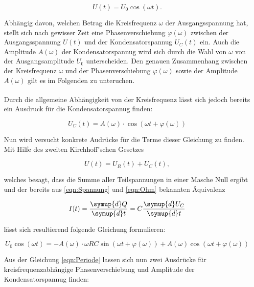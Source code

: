 \begin{equation}
    U(t) = U_0\cos(\omega t).
\end{equation}

\noindent Abhängig davon, welchen Betrag die Kreisfrequenz $\omega$ der Ausgangsspannung hat, stellt sich nach gewisser Zeit eine
Phasenverschiebung $\varphi(\omega)$ zwischen der Ausgangsspannung $U(t)$ und der Kondensatorspannug $U_C(t)$ ein. Auch
die Amplitude $A(\omega)$ der Kondensatorspannug wird sich durch die Wahl von $\omega$ von der Ausgangsamplitude $U_0$ unterscheiden.
Den genauen Zusammenhang zwischen der Kreisfrequenz $\omega$ und der Phasenverschiebung $\varphi(\omega)$ sowie der Amplitude
$A(\omega)$ gilt es im Folgenden zu unteruchen.\\\\
Durch die allgemeine Abhängigkeit von der Kreisfrequenz lässt sich jedoch bereits ein Ausdruck für die Kondensatorspannug finden:

\begin{equation*}
    U_C(t) = A(\omega)\cdot\cos\left(\omega t + \varphi(\omega)\right)
\end{equation*}

\noindent Nun wird versucht konkrete Audrücke für die Terme dieser Gleichung zu finden. Mit Hilfe des zweiten Kirchhoff'schen Gesetzes

\begin{equation*}
    U(t) = U_R(t) + U_C(t),
\end{equation*}

\noindent welches besagt, dass die Summe aller Teilspannungen in einer Masche Null ergibt und der bereits aus \eqref{eqn:Spannung} und \eqref{eqn:Ohm} bekannten Äquivalenz

\begin{equation*}
    I(t) = \frac{\symup{d}Q}{\symup{d}t}= C\frac{\symup{d}U_C}{\symup{d}t}
\end{equation*}

lässt sich resultierend folgende Gleichung formulieren:

\begin{equation}
\label{eqn:Periode}
    U_0\cos(\omega t) = -A(\omega)\cdot\omega RC\sin\left(\omega t + \varphi(\omega)\right) + A(\omega)\cos\left(\omega t + \varphi(\omega)\right)
\end{equation}

\noindent Aus der Gleichung \eqref{eqn:Periode} lassen sich nun zwei Ausdrücke für kreisfrequenzabhängige Phasenverschiebung
und Amplitude der Kondensatorspannug finden:

